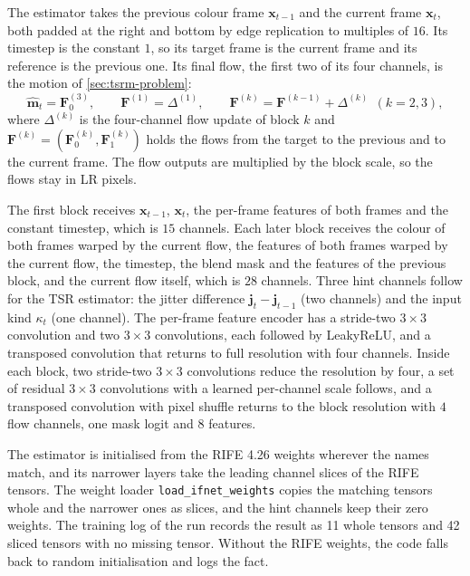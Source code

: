 The estimator takes the previous colour frame $\mathbf{x}_{t-1}$ and the current frame $\mathbf{x}_t$, both padded at the right and bottom by edge replication to multiples of $16$. Its timestep is the constant $1$, so its target frame is the current frame and its reference is the previous one. Its final flow, the first two of its four channels, is the motion of \cref{sec:tsrm-problem}:
\begin{equation}\label{eq:tsrm-est}
\hat{\mathbf{m}}_t=\mathbf{F}^{(3)}_{0},\qquad \mathbf{F}^{(1)}=\Delta^{(1)},\qquad \mathbf{F}^{(k)}=\mathbf{F}^{(k-1)}+\Delta^{(k)}\ \ (k=2,3),
\end{equation}
where $\Delta^{(k)}$ is the four-channel flow update of block $k$ and $\mathbf{F}^{(k)}=(\mathbf{F}^{(k)}_0,\mathbf{F}^{(k)}_1)$ holds the flows from the target to the previous and to the current frame. The flow outputs are multiplied by the block scale, so the flows stay in LR pixels.

The first block receives $\mathbf{x}_{t-1}$, $\mathbf{x}_t$, the per-frame features of both frames and the constant timestep, which is $15$ channels. Each later block receives the colour of both frames warped by the current flow, the features of both frames warped by the current flow, the timestep, the blend mask and the features of the previous block, and the current flow itself, which is $28$ channels. Three hint channels follow for the TSR estimator: the jitter difference $\mathbf{j}_t-\mathbf{j}_{t-1}$ (two channels) and the input kind $\kappa_t$ (one channel). The per-frame feature encoder has a stride-two $3\times3$ convolution and two $3\times3$ convolutions, each followed by LeakyReLU, and a transposed convolution that returns to full resolution with four channels. Inside each block, two stride-two $3\times3$ convolutions reduce the resolution by four, a set of residual $3\times3$ convolutions with a learned per-channel scale follows, and a transposed convolution with pixel shuffle returns to the block resolution with $4$ flow channels, one mask logit and $8$ features.

The estimator is initialised from the RIFE 4.26 weights wherever the names match, and its narrower layers take the leading channel slices of the RIFE tensors. The weight loader \texttt{load\_ifnet\_weights} copies the matching tensors whole and the narrower ones as slices, and the hint channels keep their zero weights. The training log of the  run records the result as 11 whole tensors and 42 sliced tensors with no missing tensor. Without the RIFE weights, the code falls back to random initialisation and logs the fact.

